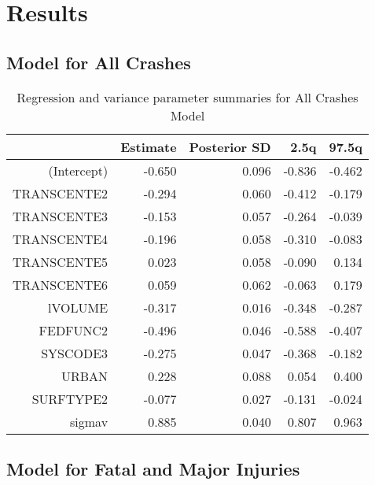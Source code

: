 \documentclass[a4paper]{article}\usepackage[]{graphicx}\usepackage[]{color}
\begin{document}
\section{Results}

\subsection{Model for All Crashes}


\begin{table}[ht]
\centering
\begin{tabular}{rrrrr}
  \hline
 & Estimate & Posterior SD & 2.5q & 97.5q \\ 
  \hline
(Intercept) & -0.650 & 0.096 & -0.836 & -0.462 \\ 
  TRANSCENTE2 & -0.294 & 0.060 & -0.412 & -0.179 \\ 
  TRANSCENTE3 & -0.153 & 0.057 & -0.264 & -0.039 \\ 
  TRANSCENTE4 & -0.196 & 0.058 & -0.310 & -0.083 \\ 
  TRANSCENTE5 & 0.023 & 0.058 & -0.090 & 0.134 \\ 
  TRANSCENTE6 & 0.059 & 0.062 & -0.063 & 0.179 \\ 
  lVOLUME & -0.317 & 0.016 & -0.348 & -0.287 \\ 
  FEDFUNC2 & -0.496 & 0.046 & -0.588 & -0.407 \\ 
  SYSCODE3 & -0.275 & 0.047 & -0.368 & -0.182 \\ 
  URBAN & 0.228 & 0.088 & 0.054 & 0.400 \\ 
  SURFTYPE2 & -0.077 & 0.027 & -0.131 & -0.024 \\ 
  sigmav & 0.885 & 0.040 & 0.807 & 0.963 \\ 
   \hline
\end{tabular}
\caption{Regression and variance parameter summaries for All Crashes Model} 
\label{allcrash}
\end{table}



\subsection{Model for Fatal and Major Injuries}
\end{document}

